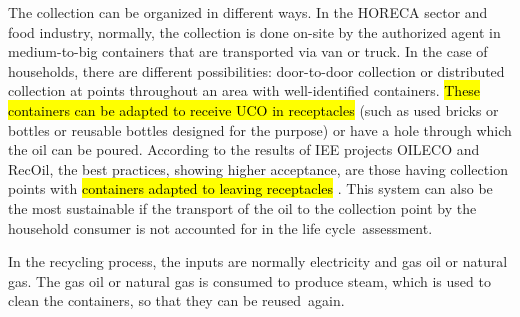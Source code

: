 \documentclass[sustainability,article,accept,moreauthors,pdftex,12pt,a4paper]{mdpi}
\begin{document}
The collection can be organized in different ways. In the HORECA sector and food industry, normally, the collection is done on-site by the authorized agent in medium-to-big containers that are transported via van or truck. In the case of households, there are different possibilities: door-to-door collection or distributed collection at points throughout an area with well-identified containers. \hl{These containers can be adapted to receive UCO in receptacles} %
 (such as used bricks or bottles or reusable bottles designed for the purpose) or have a hole through which the oil can be poured. According to the results of IEE projects OILECO and RecOil, the best practices, showing higher acceptance, are those having collection points with \hl{containers adapted to leaving receptacles} %
 \cite{OILECO2013,RecOil2013}. This system can also be the most sustainable if the transport of the oil to the collection point by the household consumer is not accounted for in the life \mbox{cycle assessment.}

In the recycling process, the inputs are normally electricity and gas oil or natural gas. The gas oil or natural gas is consumed to produce steam, which is used to clean the containers, so that they can be \mbox{reused again.}
\end{document}
